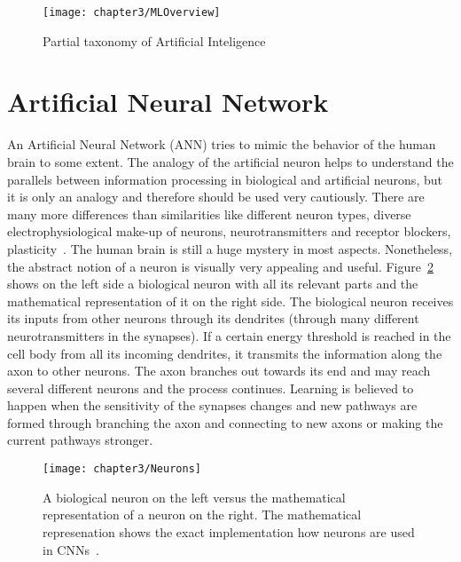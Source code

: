\begin{figure}[!h]
  \centering
  \caption{Partial taxonomy of Artificial Inteligence~\cite{alom2018history}}
  \texttt{[image: chapter3/MLOverview]}
  \label{fig:MLOverview}
\end{figure}

\section{Artificial Neural Network}

An Artificial Neural Network (ANN) tries to mimic the behavior of the human brain to some extent. The analogy of the artificial neuron helps to understand the parallels between information processing in biological and artificial neurons, but it is only an analogy and therefore should be used very cautiously. There are many more differences than similarities like different neuron types, diverse electrophysiological make-up of neurons, neurotransmitters and receptor blockers, plasticity~\cite{brunel2014single, london2005dendritic}. The human brain is still a huge mystery in most aspects. Nonetheless, the abstract notion of a neuron is visually very appealing and useful. Figure~\ref{fig:Neurons} shows on the left side a biological neuron with all its relevant parts and the mathematical representation of it on the right side. The biological neuron receives its inputs from other neurons through its dendrites (through many different neurotransmitters in the synapses). If a certain energy threshold is reached in the cell body from all its incoming dendrites, it transmits the information along the axon to other neurons. The axon branches out towards its end and may reach several different neurons and the process continues. Learning is believed to happen when the sensitivity of the synapses changes and new pathways are formed through branching the axon and connecting to new axons or making the current pathways stronger.


\begin{figure}[!h]
  \centering
  \caption{A biological neuron on the left versus the mathematical representation of a neuron on the right. The mathematical represenation shows the exact implementation how neurons are used in CNNs~\cite{cs231neuralnetworks}.}
  \texttt{[image: chapter3/Neurons]}
  \label{fig:Neurons}
\end{figure}

\quad


